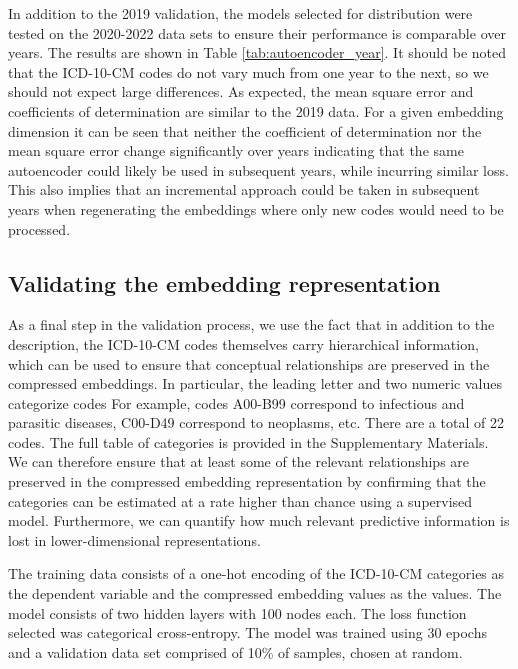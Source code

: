 \documentclass{bmcart}
\begin{document}
In addition to the 2019 validation, the models selected for distribution were
tested on the 2020-2022 data sets to ensure their performance is comparable
over years. The results are shown in Table \ref{tab:autoencoder_year}. 
It should be noted that the ICD-10-CM codes do not vary much from
one year to the next, so we should not expect large differences. As 
expected, the mean square error and coefficients of determination are similar 
to the 2019 data. For a given embedding dimension it can be seen that neither
the coefficient of determination nor the mean square error change significantly 
over years indicating that the same autoencoder
could likely be used in subsequent years, while incurring similar loss. This 
also implies that an incremental approach could be taken in subsequent
years when regenerating the 
embeddings where only new codes would need to be processed.

\subsection*{Validating the embedding representation}

As a final step in the validation process, we use the fact that in addition to
the description, the ICD-10-CM codes themselves carry hierarchical information,
which can be used to ensure that conceptual relationships are preserved
in the compressed embeddings. In particular, the leading letter and two 
numeric values categorize codes For example, codes A00-B99 correspond to
infectious and parasitic diseases, C00-D49 correspond to neoplasms, etc. 
There are a total of 22 codes. The full table of categories is provided
in the Supplementary Materials. We
can therefore ensure that at least some of the relevant relationships are 
preserved in the compressed embedding representation by confirming that
the categories can be estimated at a rate higher than chance using a 
supervised model. Furthermore, we can quantify how much relevant predictive
information is lost in lower-dimensional representations.

The training data consists of a one-hot encoding of the ICD-10-CM
categories as the dependent variable and the compressed embedding values as
the values. The model consists of two hidden layers with 100
nodes each. The loss function selected was categorical cross-entropy. The
model was trained using 30 epochs and a validation data set comprised of 10\% of
samples, chosen at random. 
\end{document}
